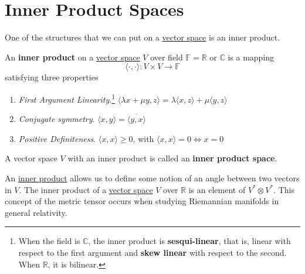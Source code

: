 \section{Inner Product Spaces}

	One of the structures that we can put on a \hyperref[def:vector-space]{vector space} is an inner product.  

  \begin{definition}
    \label{def:inner-product}
		An \textbf{inner product} on a \hyperref[def:vector-space]{vector space} $V$ over field $\mathbb{F} = \mathbb{R}$ or $\mathbb{C}$ is a mapping 
    \begin{equation}
      \langle \cdot, \cdot \rangle: V \times V \to \mathbb{F}
    \end{equation}
    satisfying three properties 
    \begin{enumerate}
			\item \textit{First Argument Linearity}.\footnote{When the field is $\mathbb{C}$, the inner product is \textbf{sesqui-linear}, that is, linear with respect to the first argument and \textbf{skew linear} with respect to the second. When $\mathbb{R}$, it is bilinear.} $\langle \lambda x + \mu y, z \rangle = \lambda \langle x, z \rangle + \mu \langle y, z \rangle$
			\item \textit{Conjugate symmetry}. $\langle x, y \rangle = \overline{\langle y, x \rangle}$
      \item \textit{Positive Definiteness}. $\langle x, x \rangle \geq 0$, with $\langle x, x \rangle = 0 \iff x = 0$
    \end{enumerate}
		A vector space $V$ with an inner product is called an \textbf{inner product space}. 
  \end{definition}

	An \hyperref[def:inner-product]{inner product} allows us to define some notion of an angle between two vectors in $V$. The inner product of a \hyperref[def:vector-space]{vector space} $V$ over $\mathbb{R}$ is an element of $V^* \otimes V^*$. This concept of the metric tensor occurs when studying Riemannian manifolds in general relativity. 


